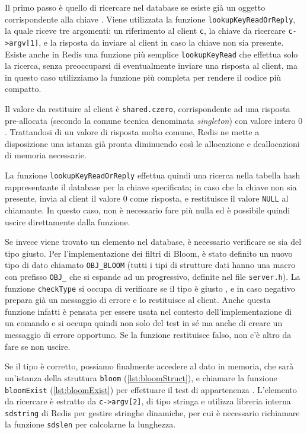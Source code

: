 Il primo passo è quello di ricercare nel database se esiste già un oggetto corrispondente alla
chiave . Viene utilizzata la funzione \verb|lookupKeyReadOrReply|, la quale riceve
tre argomenti: un riferimento al client \verb|c|, la chiave da ricercare \verb|c->argv[1]|, e 
la risposta da inviare al client in caso la chiave non sia presente. Esiste anche in Redis una
funzione più semplice \verb|lookupKeyRead| che effettua solo la ricerca, senza preoccuparsi
di eventualmente inviare una risposta al client, ma in questo caso utilizziamo la funzione
più completa per rendere il codice più compatto.

Il valore da restituire al client è \verb|shared.czero|, corrispondente ad una risposta pre-allocata
(secondo la comune tecnica denominata \emph{singleton}) con valore intero $0$. Trattandosi di un
valore di risposta molto comune, Redis ne mette a disposizione una istanza già pronta diminuendo
così le allocazione e deallocazioni di memoria necessarie.

La funzione \verb|lookupKeyReadOrReply| effettua quindi una ricerca nella tabella hash
rappresentante il database per la chiave specificata; in caso che la chiave non sia presente, invia
al client il valore $0$ come risposta, e restituisce il valore \verb|NULL| al chiamante. In questo
caso, non è necessario fare più nulla ed è possibile quindi uscire direttamente dalla funzione.

Se invece viene trovato un elemento nel database, è necessario verificare se sia del tipo giusto.
Per l'implementazione dei filtri di Bloom, è stato definito un nuovo tipo di dato chiamato 
\verb|OBJ_BLOOM| (tutti i tipi di strutture dati hanno una macro con prefisso \verb|OBJ_| che
si espande ad un progressivo, definite nel file \verb|server.h|). La funzione \verb|checkType| si
occupa di verificare se il tipo è giusto , e in caso negativo prepara già un messaggio di
errore e lo restituisce al client. Anche questa funzione infatti è pensata per essere usata nel
contesto dell'implementazione di un comando e si occupa quindi non solo del test in sé ma anche di
creare un messaggio di errore opportuno. Se la funzione restituisce falso, non c'è altro da fare se
non uscire.

Se il tipo è corretto, possiamo finalmente accedere al dato in memoria, che sarà un'istanza della
struttura \verb|bloom| (\autoref{lst:bloomStruct}), e chiamare la funzione  \verb|bloomExist|
(\autoref{lst:bloomExist}) per effettuare il test di appartenenza . L'elemento da ricercare
è estratto da \verb|c->argv[2]|, di tipo stringa e utilizza libreria interna \verb|sdstring| di
Redis per gestire stringhe dinamiche, per cui è necessario richiamare la funzione \verb|sdslen| per
calcolarne la lunghezza.

